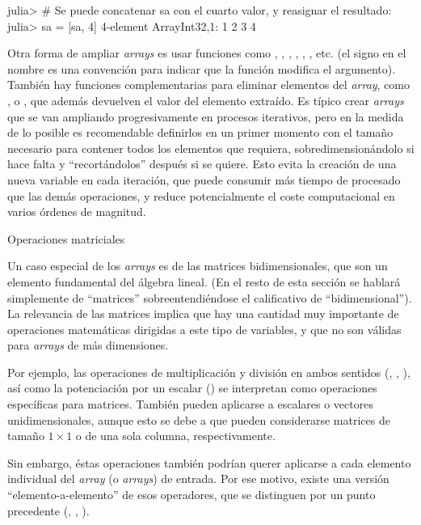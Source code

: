 ﻿\documentclass[spanish]{article}
\begin{document}
julia> # Se puede concatenar sa con el cuarto valor, y reasignar el resultado:
julia> sa = [sa, 4]
4-element Array{Int32,1}:
 1 2 3 4

Otra forma de ampliar \emph{arrays} es usar funciones como , , , , , , etc. (el signo \code{!} en el nombre es una convención para indicar que la función modifica el argumento). También hay funciones complementarias para eliminar elementos del \emph{array}, como ,  o , que además devuelven el valor del elemento extraído. Es típico crear \emph{arrays} que se van ampliando progresivamente en procesos iterativos, pero en la medida de lo posible es recomendable definirlos en un primer momento con el tamaño necesario para contener todos los elementos que requiera, sobredimensionándolo si hace falta y ``recortándolos'' después si se quiere. Esto evita la creación de una nueva variable en cada iteración, que puede consumir más tiempo de procesado que las demás operaciones, y reduce potencialmente el coste computacional en varios órdenes de magnitud.

Operaciones matriciales

Un caso especial de los \emph{arrays} es de las matrices bidimensionales, que son un elemento fundamental del álgebra lineal. (En el resto de esta sección se hablará simplemente de ``matrices'' sobreentendiéndose el calificativo de ``bidimensional''). La relevancia de las matrices implica que hay una cantidad muy importante de operaciones matemáticas dirigidas a este tipo de variables, y que no son válidas para \emph{arrays} de más dimensiones.

Por ejemplo, las operaciones de multiplicación y división en ambos sentidos (\code{*}, \code{/}, \code{\\} ), así como la potenciación por un escalar (\code{^}) se interpretan como operaciones específicas para matrices. También pueden aplicarse a escalares o vectores unidimensionales, aunque esto se debe a que pueden considerarse matrices de tamaño $1\times{}1$ o de una sola columna, respectivamente.

Sin embargo, éstas operaciones también podrían querer aplicarse a cada elemento individual del \emph{array} (o \emph{arrays}) de entrada. Por ese motivo, existe una versión ``elemento-a-elemento'' de esos operadores, que se distinguen por un punto precedente (, , ).
\end{document}
